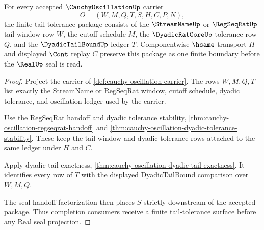 \begin{theorem}
\label{thm:cauchy-oscillation-tail-tolerance-package}
For every accepted $\CauchyOscillationUp$ carrier
$$
O=(W,M,Q,T,S,H,C,P,N),
$$
the finite tail-tolerance package consists of the $\StreamNameUp$ or $\RegSeqRatUp$ tail-window row $W$, the cutoff schedule $M$, the $\DyadicRatCoreUp$ tolerance row $Q$, and the $\DyadicTailBoundUp$ ledger $T$. Componentwise $\hsame$ transport $H$ and displayed $\Cont$ replay $C$ preserve this package as one finite boundary before the $\RealUp$ seal is read.
\end{theorem}
\begin{proof}
Project the carrier of \autoref{def:cauchy-oscillation-carrier}. The rows $W,M,Q,T$ list exactly the StreamName or RegSeqRat window, cutoff schedule, dyadic tolerance, and oscillation ledger used by the carrier.

Use the RegSeqRat handoff and dyadic tolerance stability, \autoref{thm:cauchy-oscillation-regseqrat-handoff} and \autoref{thm:cauchy-oscillation-dyadic-tolerance-stability}. These keep the tail-window and dyadic tolerance rows attached to the same ledger under $H$ and $C$.

Apply dyadic tail exactness, \autoref{thm:cauchy-oscillation-dyadic-tail-exactness}. It identifies every row of $T$ with the displayed DyadicTailBound comparison over $W,M,Q$.

The seal-handoff factorization then places $S$ strictly downstream of the accepted package. Thus completion consumers receive a finite tail-tolerance surface before any Real seal projection.
\end{proof}

